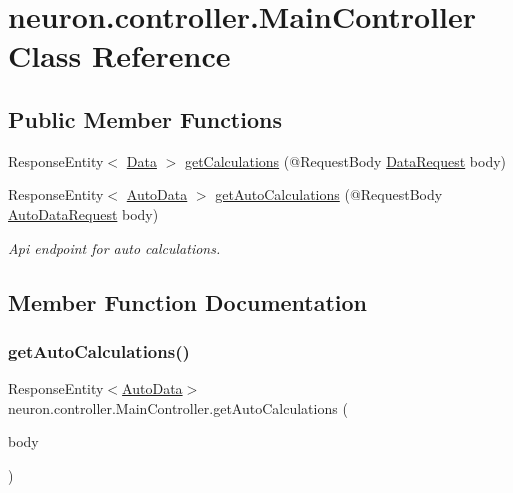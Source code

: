 \hypertarget{classneuron_1_1controller_1_1MainController}{}\section{neuron.\+controller.\+Main\+Controller Class Reference}
\label{classneuron_1_1controller_1_1MainController}
\subsection*{Public Member Functions}
\begin{DoxyCompactItemize}
\item 
Response\+Entity$<$ \hyperlink{classneuron_1_1entities_1_1Data}{Data} $>$ \hyperlink{classneuron_1_1controller_1_1MainController_a178300c3c52f707b61cad563f3ddf874}{get\+Calculations} (@Request\+Body \hyperlink{classneuron_1_1web_1_1DataRequest}{Data\+Request} body)
\item 
Response\+Entity$<$ \hyperlink{classneuron_1_1entities_1_1AutoData}{Auto\+Data} $>$ \hyperlink{classneuron_1_1controller_1_1MainController_a9bb020e19ae52933e586e9c0e302826b}{get\+Auto\+Calculations} (@Request\+Body \hyperlink{classneuron_1_1web_1_1AutoDataRequest}{Auto\+Data\+Request} body)
\begin{DoxyCompactList}\small\item\em Api endpoint for auto calculations. \end{DoxyCompactList}\end{DoxyCompactItemize}


\subsection{Member Function Documentation}
\mbox{\label{classneuron_1_1controller_1_1MainController_a9bb020e19ae52933e586e9c0e302826b}} 
\subsubsection{\texorpdfstring{get\+Auto\+Calculations()}{getAutoCalculations()}}
{\footnotesize\ttfamily Response\+Entity$<$\hyperlink{classneuron_1_1entities_1_1AutoData}{Auto\+Data}$>$ neuron.\+controller.\+Main\+Controller.\+get\+Auto\+Calculations (\begin{DoxyParamCaption}\item[{@Request\+Body \hyperlink{classneuron_1_1web_1_1AutoDataRequest}{Auto\+Data\+Request}}]{body }\end{DoxyParamCaption})}



